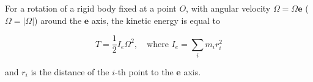 For a rotation of a rigid body fixed at a point $O$, with angular velocity $\Omega = \Omega \mathbf{e}$ ($\Omega = |\Omega|$) around the $\mathbf{e}$ axis, the kinetic energy is equal to

$$T = \frac{1}{2} I_e \Omega^2, \quad \text{where } I_e = \sum_i m_i r_i^2$$

and $r_i$ is the distance of the $i$-th point to the $\mathbf{e}$ axis.
